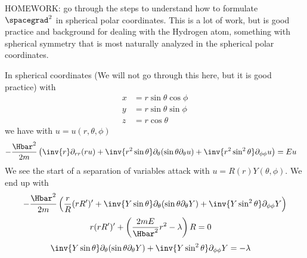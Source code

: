 %
%
HOMEWORK: go through the steps to understand how to formulate \(\spacegrad^2\) in spherical polar coordinates.  This is a lot of work, but is good practice and background for dealing with the Hydrogen atom, something with spherical symmetry that is most naturally analyzed in the spherical polar coordinates.

In spherical coordinates (We will not go through this here, but it is good practice) with
%
\begin{equation}\label{eqn:lecture5BigReviewAngularMomentum:5020}
\begin{aligned}
x &= r \sin\theta \cos\phi \\
y &= r \sin\theta \sin\phi \\
z &= r \cos\theta
\end{aligned}
\end{equation}
%
we have with \(u = u(r,\theta, \phi)\)
%
\begin{equation}\label{eqn:lecture5BigReviewAngularMomentum:5040}
\begin{aligned}
-\frac{\Hbar^2}{2m} \left(
\inv{r} \partial_{rr} (r u) +  \inv{r^2 \sin\theta} \partial_\theta (\sin\theta \partial_\theta u)
+ \inv{r^2 \sin^2\theta} \partial_{\phi\phi} u
 \right)
&= E u
\end{aligned}
\end{equation}
%
We see the start of a separation of variables attack with \(u = R(r) Y(\theta, \phi)\).  We end up with
%
\begin{equation}\label{eqn:lecture5BigReviewAngularMomentum:5060}
\begin{aligned}
-\frac{\Hbar^2}{2m} &\left(
\frac{r}{R} (r R')' +  \inv{Y \sin\theta} \partial_\theta (\sin\theta \partial_\theta Y)
+ \inv{Y \sin^2\theta} \partial_{\phi\phi} Y
 \right) \\
\end{aligned}
\end{equation}
%
\begin{equation}\label{eqn:lecture5BigReviewAngularMomentum:5080}
\begin{aligned}
r (r R')' + \left( \frac{2m E}{\Hbar^2} r^2 - \lambda \right) R &= 0
\end{aligned}
\end{equation}
\begin{equation}\label{eqn:lecture5BigReviewAngularMomentum:5100}
\begin{aligned}
\inv{Y \sin\theta} \partial_\theta (\sin\theta \partial_\theta Y) + \inv{Y \sin^2\theta} \partial_{\phi\phi} Y &= -\lambda
\end{aligned}
\end{equation}
